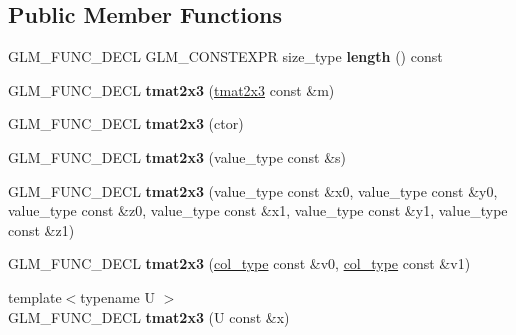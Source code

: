 \subsection*{Public Member Functions}
\begin{DoxyCompactItemize}
\item 
\hypertarget{structglm_1_1detail_1_1tmat2x3_ad64fb15bec8eacecffd0ba33083ec197}{}G\+L\+M\+\_\+\+F\+U\+N\+C\+\_\+\+D\+E\+C\+L G\+L\+M\+\_\+\+C\+O\+N\+S\+T\+E\+X\+P\+R size\+\_\+type {\bfseries length} () const \label{structglm_1_1detail_1_1tmat2x3_ad64fb15bec8eacecffd0ba33083ec197}

\item 
\hypertarget{structglm_1_1detail_1_1tmat2x3_a882c554a039fb6f05295d25230876408}{}G\+L\+M\+\_\+\+F\+U\+N\+C\+\_\+\+D\+E\+C\+L {\bfseries tmat2x3} (\hyperlink{structglm_1_1detail_1_1tmat2x3}{tmat2x3} const \&m)\label{structglm_1_1detail_1_1tmat2x3_a882c554a039fb6f05295d25230876408}

\item 
\hypertarget{structglm_1_1detail_1_1tmat2x3_a55e83395bf56965a48cd4604b4644cab}{}G\+L\+M\+\_\+\+F\+U\+N\+C\+\_\+\+D\+E\+C\+L {\bfseries tmat2x3} (ctor)\label{structglm_1_1detail_1_1tmat2x3_a55e83395bf56965a48cd4604b4644cab}

\item 
\hypertarget{structglm_1_1detail_1_1tmat2x3_abf51ec12b9ea2ee650ef0cd4854a85cc}{}G\+L\+M\+\_\+\+F\+U\+N\+C\+\_\+\+D\+E\+C\+L {\bfseries tmat2x3} (value\+\_\+type const \&s)\label{structglm_1_1detail_1_1tmat2x3_abf51ec12b9ea2ee650ef0cd4854a85cc}

\item 
\hypertarget{structglm_1_1detail_1_1tmat2x3_a723c041ca01d0846e7ac1e2cf94fa388}{}G\+L\+M\+\_\+\+F\+U\+N\+C\+\_\+\+D\+E\+C\+L {\bfseries tmat2x3} (value\+\_\+type const \&x0, value\+\_\+type const \&y0, value\+\_\+type const \&z0, value\+\_\+type const \&x1, value\+\_\+type const \&y1, value\+\_\+type const \&z1)\label{structglm_1_1detail_1_1tmat2x3_a723c041ca01d0846e7ac1e2cf94fa388}

\item 
\hypertarget{structglm_1_1detail_1_1tmat2x3_a6219dd710c9dc7a235745543995c2034}{}G\+L\+M\+\_\+\+F\+U\+N\+C\+\_\+\+D\+E\+C\+L {\bfseries tmat2x3} (\hyperlink{structglm_1_1detail_1_1tvec3}{col\+\_\+type} const \&v0, \hyperlink{structglm_1_1detail_1_1tvec3}{col\+\_\+type} const \&v1)\label{structglm_1_1detail_1_1tmat2x3_a6219dd710c9dc7a235745543995c2034}

\item 
\hypertarget{structglm_1_1detail_1_1tmat2x3_ad5c1b77b2c1b21348f3fc31b9efd62b5}{}{\footnotesize template$<$typename U $>$ }\\G\+L\+M\+\_\+\+F\+U\+N\+C\+\_\+\+D\+E\+C\+L {\bfseries tmat2x3} (U const \&x)\label{structglm_1_1detail_1_1tmat2x3_ad5c1b77b2c1b21348f3fc31b9efd62b5}


\end{DoxyCompactItemize}

